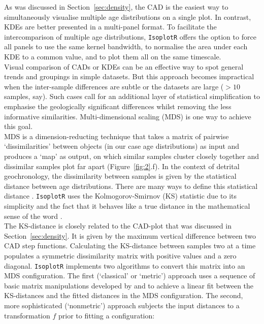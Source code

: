 \documentclass{article}
\begin{document}
As was discussed in Section~\ref{sec:density}, the CAD is the easiest
way to simultaneously visualise multiple age distributions on a single
plot. In contrast, KDEs are better presented in a multi-panel
format. To facilitate the intercomparison of multiple age
distributions, \texttt{IsoplotR} offers the option to force all panels
to use the same kernel bandwidth, to normalise the area under each KDE
to a common value, and to plot them all on the same timescale.\\

Visual comparison of CADs or KDEs can be an effective way to spot
general trends and groupings in simple datasets. But this approach
becomes impractical when the inter-sample differences are subtle or
the datasets are large ($> 10$ samples, say). Such cases call for an
additional layer of statistical simplification to emphasise the
geologically significant differences whilst removing the less
informative similarities. Multi-dimensional scaling (MDS) is one way
to achieve this goal.\\

MDS is a dimension-reducting technique that takes a matrix of pairwise
`dissimilarities' between objects (in our case age distributions) as
input and produces a `map' as output, on which similar samples cluster
closely together and dissimilar samples plot far apart
(Figure~\ref{fig:2}.f). In the context of detrital geochronology, the
dissimilarity between samples is given by the statistical distance
between age distributions. There are many ways to define this
statistical distance \citep{vermeesch2018b}. \texttt{IsoplotR} uses
the Kolmogorov-Smirnov (KS) statistic due to its simplicity and the
fact that it behaves like a true distance in the mathematical sense of
the word \citep{vermeesch2013, vermeesch2018b}.\\

The KS-distance is closely related to the CAD-plot that was discussed
in Section~\ref{sec:density}.  It is given by the maximum vertical
difference between two CAD step functions.  Calculating the
KS-distance between samples two at a time populates a symmetric
dissimilarity matrix with positive values and a zero
diagonal. \texttt{IsoplotR} implements two algorithms to convert this
matrix into an MDS configuration. The first (`classical' or `metric')
approach uses a sequence of basic matrix manipulations developed by
\citet{young1938} and \citet{torgerson1952} to achieve a linear fit
between the KS-distances and the fitted distances in the MDS
configuration. The second, more sophisticated (`nonmetric') approach
subjects the input distances to a transformation $f$ prior to fitting
a configuration:
\end{document}
